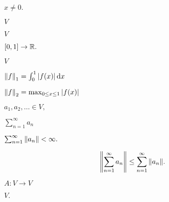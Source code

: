 \documentclass[10pt]{book}
\begin{document}
\begin{mdSnippets}
\begin{mdInlineSnippet}[3198651f791aee4036bd038ad164424f]
$x \ne 0.$\end{mdInlineSnippet}%
\begin{mdInlineSnippet}[5206560a306a2e085a437fd258eb57ce]%
$V$\end{mdInlineSnippet}%
\begin{mdInlineSnippet}[5206560a306a2e085a437fd258eb57ce]%
$V$\end{mdInlineSnippet}%
\begin{mdInlineSnippet}%
$[0,1] \to \mathbb{R}.$\end{mdInlineSnippet}%
\begin{mdInlineSnippet}[5206560a306a2e085a437fd258eb57ce]%
$V$\end{mdInlineSnippet}%
\begin{mdInlineSnippet}%
$\norm{f}_1 = \int_0^1 \left\vert f(x)\right\vert \dd{x}$\end{mdInlineSnippet}%
\begin{mdInlineSnippet}%
$\norm{f}_2 = \max_{0 \le x \le 1} \left\vert f(x)\right\vert$\end{mdInlineSnippet}%
\begin{mdInlineSnippet}[69e3271e98f8e97c1304ed44c550eb78]%
$a_1, a_2, \dots \in V,$\end{mdInlineSnippet}%
\begin{mdInlineSnippet}[54ba1b9ca3c516d292b7f143b13c2d99]%
$\sum_{n=1}^\infty a_n$\end{mdInlineSnippet}%
\begin{mdInlineSnippet}[2315872774f71c6c798bfa2709e5292c]%
$\sum_{n=1}^\infty \norm{a_n} < \infty.$\end{mdInlineSnippet}%
\begin{mdDisplaySnippet}[c2c199e3ae25968cc2af2322b891ff2c]%
\[%
\norm{\sum_{n=1}^\infty a_n} \le \sum_{n=1}^\infty \norm{a_n}.
\]%
\end{mdDisplaySnippet}%
\begin{mdInlineSnippet}[3803e0504fbff96c773375f64b1287d1]%
$A: V \to V$\end{mdInlineSnippet}%
\begin{mdInlineSnippet}%
$V.$\end{mdInlineSnippet}%

\end{mdSnippets}
\end{document}
